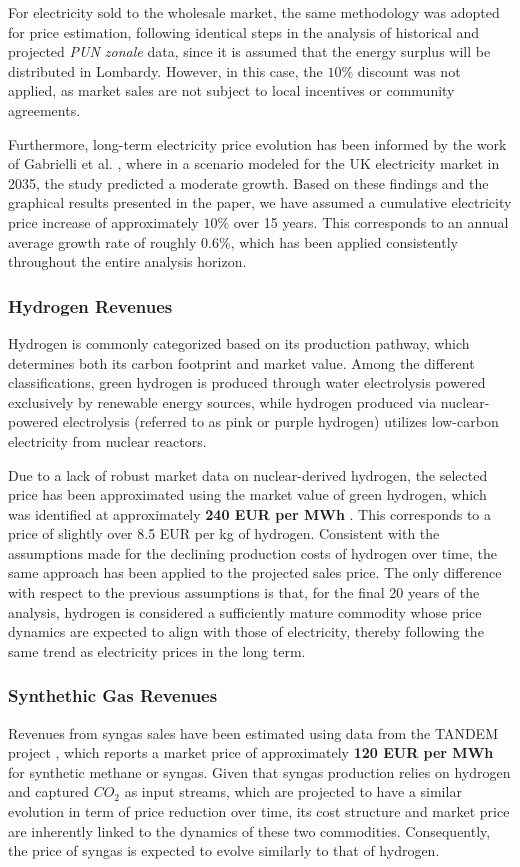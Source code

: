 For electricity sold to the wholesale market, the same methodology was adopted for price estimation, following identical steps in the analysis of historical and projected \textit{PUN zonale} data, since it is assumed that the energy surplus will be distributed in Lombardy. However, in this case, the $10\%$ discount was not applied, as market sales are not subject to local incentives or community agreements.

Furthermore, long-term electricity price evolution has been informed by the work of Gabrielli et al. \cite{Gabrielli2022}, where in a scenario modeled for the UK electricity market in 2035, the study predicted a moderate growth. Based on these findings and the graphical results presented in the paper, we have assumed a cumulative electricity price increase of approximately $10\%$ over 15 years. This corresponds to an annual average growth rate of roughly $0.6\%$, which has been applied consistently throughout the entire analysis horizon.

\subsubsection{Hydrogen Revenues}
Hydrogen is commonly categorized based on its production pathway, which determines both its carbon footprint and market value. Among the different classifications, green hydrogen is produced through water electrolysis powered exclusively by renewable energy sources, while hydrogen produced via nuclear-powered electrolysis (referred to as pink or purple hydrogen) utilizes low-carbon electricity from nuclear reactors. 

Due to a lack of robust market data on nuclear-derived hydrogen, the selected price has been approximated using the market value of green hydrogen, which was identified at approximately \textbf{240 EUR per MWh} \cite{EEX2025}. This corresponds to a price of slightly over 8.5 EUR per kg of hydrogen. Consistent with the assumptions made for the declining production costs of hydrogen over time, the same approach has been applied to the projected sales price. The only difference with respect to the previous assumptions is that, for the final 20 years of the analysis, hydrogen is considered a sufficiently mature commodity whose price dynamics are expected to align with those of electricity, thereby following the same trend as electricity prices in the long term.

\subsubsection{Synthethic Gas Revenues}
Revenues from syngas sales have been estimated using data from the TANDEM project \cite{TANDEM2023}, which reports a market price of approximately \textbf{120 EUR per MWh} for synthetic methane or syngas. Given that syngas production relies on hydrogen and captured $CO_2$ as input streams, which are projected to have a similar evolution in term of price reduction over time, its cost structure and market price are inherently linked to the dynamics of these two commodities.
Consequently, the price of syngas is expected to evolve similarly to that of hydrogen. 

